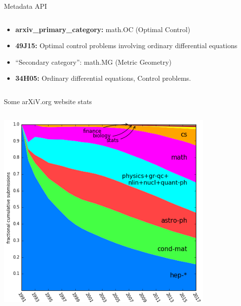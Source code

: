 \documentclass[9pt]{beamer}
\begin{document}
\begin{frame}{Metadata API}
\begin{columns}[T]
\begin{column}{0.6\textwidth}
\begin{itemize}
                \item \textbf{arxiv\_primary\_category:} math.OC (Optimal Control)
                \item \textbf{49J15:} Optimal control problems involving ordinary differential equations
                        \item ``Secondary category'': math.MG (Metric Geometry)
                        \item \textbf{34H05:} Ordinary differential equations, Control problems.
                    \end{itemize}
        \end{column}
    \end{columns}
\end{frame}

\begin{frame}{Some arXiV.org website stats}
    \begin{columns}[T]
        \begin{column}{0.5\textwidth}
    \includegraphics[width=\textwidth]{cum_submissions.png} 
        \end{column}
        \begin{column}{0.5\textwidth}
\end{column}
\end{columns}
\end{frame}
\end{document}
